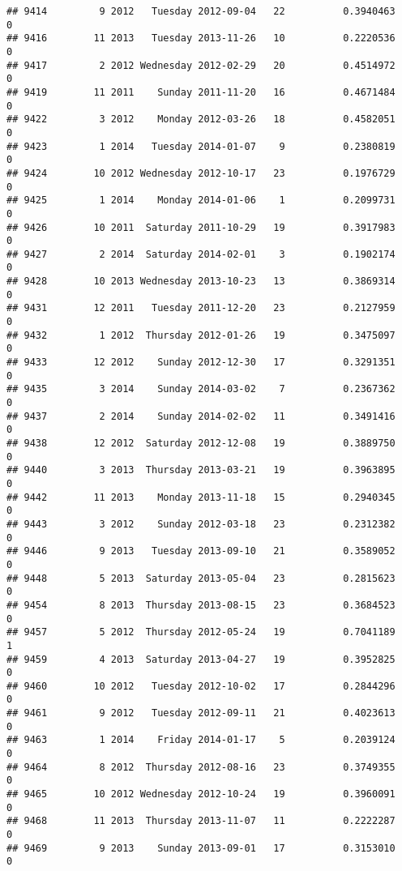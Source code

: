 \documentclass[
]{article}
\begin{document}
\begin{verbatim}
## 9414         9 2012   Tuesday 2012-09-04   22          0.3940463             0
## 9416        11 2013   Tuesday 2013-11-26   10          0.2220536             0
## 9417         2 2012 Wednesday 2012-02-29   20          0.4514972             0
## 9419        11 2011    Sunday 2011-11-20   16          0.4671484             0
## 9422         3 2012    Monday 2012-03-26   18          0.4582051             0
## 9423         1 2014   Tuesday 2014-01-07    9          0.2380819             0
## 9424        10 2012 Wednesday 2012-10-17   23          0.1976729             0
## 9425         1 2014    Monday 2014-01-06    1          0.2099731             0
## 9426        10 2011  Saturday 2011-10-29   19          0.3917983             0
## 9427         2 2014  Saturday 2014-02-01    3          0.1902174             0
## 9428        10 2013 Wednesday 2013-10-23   13          0.3869314             0
## 9431        12 2011   Tuesday 2011-12-20   23          0.2127959             0
## 9432         1 2012  Thursday 2012-01-26   19          0.3475097             0
## 9433        12 2012    Sunday 2012-12-30   17          0.3291351             0
## 9435         3 2014    Sunday 2014-03-02    7          0.2367362             0
## 9437         2 2014    Sunday 2014-02-02   11          0.3491416             0
## 9438        12 2012  Saturday 2012-12-08   19          0.3889750             0
## 9440         3 2013  Thursday 2013-03-21   19          0.3963895             0
## 9442        11 2013    Monday 2013-11-18   15          0.2940345             0
## 9443         3 2012    Sunday 2012-03-18   23          0.2312382             0
## 9446         9 2013   Tuesday 2013-09-10   21          0.3589052             0
## 9448         5 2013  Saturday 2013-05-04   23          0.2815623             0
## 9454         8 2013  Thursday 2013-08-15   23          0.3684523             0
## 9457         5 2012  Thursday 2012-05-24   19          0.7041189             1
## 9459         4 2013  Saturday 2013-04-27   19          0.3952825             0
## 9460        10 2012   Tuesday 2012-10-02   17          0.2844296             0
## 9461         9 2012   Tuesday 2012-09-11   21          0.4023613             0
## 9463         1 2014    Friday 2014-01-17    5          0.2039124             0
## 9464         8 2012  Thursday 2012-08-16   23          0.3749355             0
## 9465        10 2012 Wednesday 2012-10-24   19          0.3960091             0
## 9468        11 2013  Thursday 2013-11-07   11          0.2222287             0
## 9469         9 2013    Sunday 2013-09-01   17          0.3153010             0

\end{verbatim}
\end{document}
